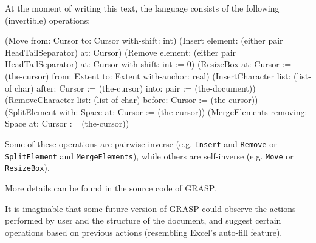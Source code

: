 \documentclass[sigconf]{acmart}
\newenvironment{Snippet}{\Verbatim[samepage=true]}{\endVerbatim}
\begin{document}
At the moment of writing this text, the language
consists of the following (invertible) operations:

\begin{Snippet}
(Move from: Cursor to: Cursor with-shift: int)
\end{Snippet}
\begin{Snippet}
(Insert element: (either pair HeadTailSeparator)
	at: Cursor)
\end{Snippet}
\begin{Snippet}
(Remove element: (either pair HeadTailSeparator)
	at: Cursor with-shift: int := 0)
\end{Snippet}
\begin{Snippet}
(ResizeBox at: Cursor := (the-cursor)
	   from: Extent
	   to: Extent
	   with-anchor: real)
\end{Snippet}
\begin{Snippet}
(InsertCharacter list: (list-of char)
		 after: Cursor := (the-cursor)
		 into: pair := (the-document))
\end{Snippet}
\begin{Snippet}
(RemoveCharacter list: (list-of char)
		 before: Cursor := (the-cursor))
\end{Snippet}
\begin{Snippet}
(SplitElement with: Space 
	      at: Cursor := (the-cursor))
\end{Snippet}
\begin{Snippet}
(MergeElements removing: Space
	       at: Cursor := (the-cursor))
\end{Snippet}

Some of these operations are pairwise
inverse (e.g. \texttt{Insert} and \texttt{Remove}
or \texttt{SplitElement} and \texttt{MergeElements}),
while others are self-inverse (e.g. \texttt{Move}
or \texttt{ResizeBox}).

More details can be found in the source code
of GRASP.

It is imaginable that some future version
of GRASP could observe the actions performed
by user and the structure of the document,
and suggest certain operations based on
previous actions (resembling Excel's auto-fill
feature).


\end{document}
